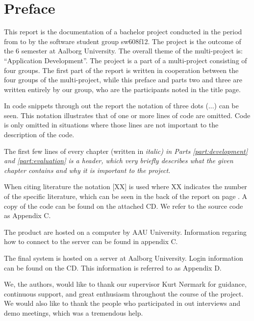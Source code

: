 \chapter*{Preface}
\label{chap:preface}
This report is the documentation of a bachelor project conducted in the period from  to  by the software student group sw608f12.
The project is the outcome of the 6\ths{} semester at Aalborg University. 
The overall theme of the multi-project is: ``Application Development''. 
The project is a part of a multi-project consisting of four groups. 
The first part of the report is written in cooperation between the four groups of the multi-project, while this preface and parts two and three are written entirely by our group, who are the participants noted in the title page.

In code snippets through out the report the notation of three dots (...)  can be seen.
This notation illustrates that of one or more lines of code are omitted. 
Code is only omitted in situations where those lines are not important to the description of the code. 

The first few lines of every chapter (written in \it{italic}) in Parts \ref{part:development} and \ref{part:evaluation} is a header, which very briefly describes what the given chapter contains and why it is important to the project.

When citing literature the notation [XX] is used where XX indicates the number of the specific literature, which can be seen in the back of the report on page \pageref{chap:bib}.
A copy of the code can be found on the attached CD. 
We refer to the source code as Appendix C.

The product are hosted on a computer by AAU University. 
Information regaring how to connect to the server can be found in appendix C.

The final system is hosted on a server at Aalborg University.
Login information can be found on the CD.
This information is referred to as Appendix D.

We, the authors, would like to thank our supervisor Kurt N\o{}rmark for guidance, continuous support, and great enthusiasm throughout the course of the project.
We would also like to thank the people who participated in out interviews and demo meetings, which was a tremendous help.